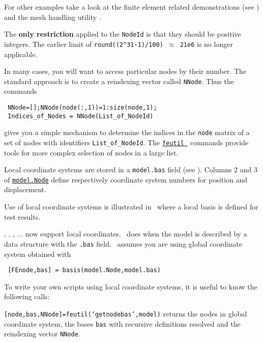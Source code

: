 For other examples take a look at the finite element related demonstrations (see ) and the mesh handling utility \femesh.

\lvs The {\bf only restriction} applied to the {\tt NodeId} is that they should be positive integers. The earlier limit of {\tt round((2\verb+^+31-1)/100) $\approx$ 21e6} is no longer applicable. 

In many cases, you will want to access particular nodes by their number. The standard approach is to create a reindexing vector called {\tt NNode}. Thus the commands

\begin{verbatim}
 NNode=[];NNode(node(:,1))=1:size(node,1);
 Indices_of_Nodes = NNode(List_of_NodeId) 
\end{verbatim}

\noindent gives you a simple mechanism to determine the indices in the {\tt node} matrix of a set of nodes with identifiers {\tt List\_of\_NodeId}. The \hyperlink{findnode}{{\tt feutil }} commands provide tools for more complex selection of nodes in a large list.


Local coordinate systems are stored in a {\tt model.bas} field (see ). Columns 2 and 3 of \hyperlink{node}{{\tt model.Node}} define respectively coordinate system numbers for position and displacement. 

\begin{SDT}
Use of local coordinate systems is illustrated in~ where a local basis is defined for test results.
\end{SDT}

\feplot, \femk, \rigid, ... now support local coordinates. \feutil\ does when the model is described by a data structure with the {\tt .bas} field. \femesh\ assumes you are using global coordinate system obtained with

\begin{verbatim}
 [FEnode,bas] = basis(model.Node,model.bas)
\end{verbatim}

To write your own scripts using local coordinate systems, it is useful to know the following calls:

{\tt [node,bas,NNode]=feutil('getnodebas',model)} returns the nodes in global coordinate system, the bases {\tt bas} with recursive definitions resolved and the reindexing vector {\tt NNode}. 

